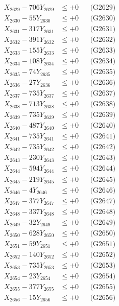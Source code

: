 \documentclass[a4paper,10pt]{article}
\begin{document}
{\begin{align}
X_{2629} - 706Y_{2629} &\leq +0 && \text{(G2629)} \\
X_{2630} - 55Y_{2630} &\leq +0 && \text{(G2630)} \\
\allowbreak
X_{2631} - 317Y_{2631} &\leq +0 && \text{(G2631)} \\
X_{2632} - 391Y_{2632} &\leq +0 && \text{(G2632)} \\
X_{2633} - 155Y_{2633} &\leq +0 && \text{(G2633)} \\
X_{2634} - 108Y_{2634} &\leq +0 && \text{(G2634)} \\
X_{2635} - 74Y_{2635} &\leq +0 && \text{(G2635)} \\
X_{2636} - 27Y_{2636} &\leq +0 && \text{(G2636)} \\
X_{2637} - 735Y_{2637} &\leq +0 && \text{(G2637)} \\
X_{2638} - 713Y_{2638} &\leq +0 && \text{(G2638)} \\
X_{2639} - 735Y_{2639} &\leq +0 && \text{(G2639)} \\
X_{2640} - 487Y_{2640} &\leq +0 && \text{(G2640)} \\
\allowbreak
X_{2641} - 735Y_{2641} &\leq +0 && \text{(G2641)} \\
X_{2642} - 735Y_{2642} &\leq +0 && \text{(G2642)} \\
X_{2643} - 230Y_{2643} &\leq +0 && \text{(G2643)} \\
X_{2644} - 594Y_{2644} &\leq +0 && \text{(G2644)} \\
X_{2645} - 219Y_{2645} &\leq +0 && \text{(G2645)} \\
X_{2646} - 4Y_{2646} &\leq +0 && \text{(G2646)} \\
X_{2647} - 377Y_{2647} &\leq +0 && \text{(G2647)} \\
X_{2648} - 337Y_{2648} &\leq +0 && \text{(G2648)} \\
X_{2649} - 32Y_{2649} &\leq +0 && \text{(G2649)} \\
X_{2650} - 628Y_{2650} &\leq +0 && \text{(G2650)} \\
\allowbreak
X_{2651} - 59Y_{2651} &\leq +0 && \text{(G2651)} \\
X_{2652} - 140Y_{2652} &\leq +0 && \text{(G2652)} \\
X_{2653} - 735Y_{2653} &\leq +0 && \text{(G2653)} \\
X_{2654} - 23Y_{2654} &\leq +0 && \text{(G2654)} \\
X_{2655} - 377Y_{2655} &\leq +0 && \text{(G2655)} \\
X_{2656} - 15Y_{2656} &\leq +0 && \text{(G2656)} \\

\end{align}}
\end{document}

